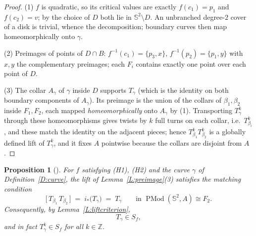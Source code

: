 \documentclass[11pt]{amsart}
\newtheorem{proposition}[theorem]{Proposition}
\newcommand{\Sph}{\mathbb{S}^{2}}
\newcommand{\PMod}{\operatorname{PMod}}
\begin{document}
\begin{proof}
(1) $f$ is quadratic, so its critical values are exactly $f(c_1)=p_1$ and
$f(c_2)=v$; by the choice of $D$ both lie in $\Sph\setminus D$. An
unbranched degree-$2$ cover of a disk is trivial, whence the
decomposition; boundary curves then map homeomorphically onto $\gamma$.

(2) Preimages of points of $D\cap B$: $f^{-1}(c_1)=\{p_3,x\}$,
$f^{-1}(p_2)=\{p_1,y\}$ with $x,y$ the complementary preimages; each $F_i$
contains exactly one point over each point of $D$.

(3) The collar $A_\gamma$ of $\gamma$ inside $D$ supports $T_\gamma$ (which
is the identity on both boundary components of $A_\gamma$). Its preimage is
the union of the collars of $\beta_1,\beta_2$ inside $F_1,F_2$, each mapped
\emph{homeomorphically} onto $A_\gamma$ by (1). Transporting $T_\gamma^k$
through these homeomorphisms gives twists by $k$ full turns on each
collar, i.e.\ $T_{\beta_i}^k$, and these match the identity on the adjacent
pieces; hence $T_{\beta_1}^kT_{\beta_2}^k$ is a globally defined lift of
$T_\gamma^k$, and it fixes $A$ pointwise because the collars are disjoint
from $A$.
\end{proof}

\begin{proposition}[]
\label{P:inSf}
For $f$ satisfying {\rm (H1)}, {\rm (H2)} and the curve $\gamma$ of
Definition~\emph{\ref{D:curve}}, the lift of Lemma~\emph{\ref{L:preimage}}(3)
satisfies the matching condition
\[
\bigl[\,T_{\beta_1}\,T_{\beta_2}\,\bigr]\;=\;i_*\bigl(T_\gamma\bigr)
\;=\;T_\gamma
\qquad\text{in }\PMod(\Sph,A)\cong F_2 .
\]
Consequently, by Lemma~\emph{\ref{L:liftcriterion}},
\[
T_\gamma\in S_f,
\]
and in fact $T_\gamma^k\in S_f$ for all $k\in\mathbb{Z}$.
\end{proposition}
\end{document}
